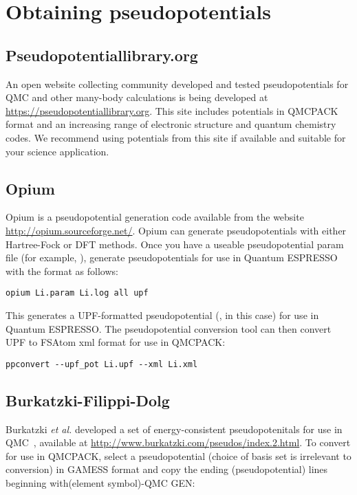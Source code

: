 \section{Obtaining pseudopotentials}

\subsection{Pseudopotentiallibrary.org}

An open website collecting community developed and tested
pseudopotentials for QMC and other many-body calculations is being
developed at \url{https://pseudopotentiallibrary.org}. This site
includes potentials in QMCPACK format and an increasing range of
electronic structure and quantum chemistry codes. We recommend using
potentials from this site if available and suitable for your science
application.

\subsection{Opium}
\label{subsec:opium}

Opium is a pseudopotential generation code available from the website \url{http://opium.sourceforge.net/}.  Opium can generate pseudopotentials with either Hartree-Fock or DFT methods.  Once you have a useable pseudopotential param file (for example, ), generate pseudopotentials for use in Quantum ESPRESSO with the  format as follows:
\begin{lstlisting}[caption=Generate UPF-formatted pseudopotential with Opium]
opium Li.param Li.log all upf
\end{lstlisting}
This generates a UPF-formatted pseudopotential (, in this case) for use in Quantum ESPRESSO.  The pseudopotential conversion tool  can then convert UPF to FSAtom xml format for use in QMCPACK:
\begin{lstlisting}[caption=Convert UPF-formatted pseudopotential to FSAtom xml format]
ppconvert --upf_pot Li.upf --xml Li.xml
\end{lstlisting}

\subsection{Burkatzki-Filippi-Dolg}
\label{subsec:BFD}

Burkatzki \textit{et al.} developed a set of energy-consistent pseudopotenitals for use in QMC~\cite{Burkatzki07,Burkatzki08}, available at \url{http://www.burkatzki.com/pseudos/index.2.html}.  To convert for use in QMCPACK, select a pseudopotential (choice of basis set is irrelevant to conversion) in GAMESS format and copy the ending (pseudopotential) lines beginning with(element symbol)-QMC GEN:

